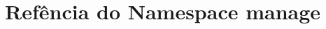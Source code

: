 \hypertarget{namespacemanage}{\section{Refência do Namespace manage}
\label{da/df4/namespacemanage}
}
